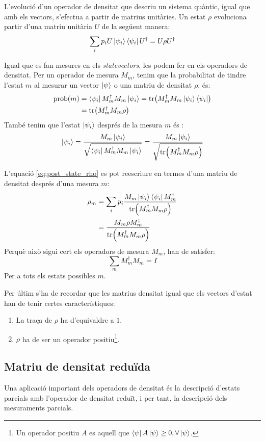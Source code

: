 L'evolució d'un operador de densitat que descriu un sistema quàntic, igual que amb els vectors, s'efectua a partir de matrius unitàries. Un estat $\rho$ evoluciona partir d'una matriu unitària $U$ de la següent manera:
$$
\sum_i p_i U \ket{\psi_i}\bra{\psi_i} U^\dagger = U\rho U^\dagger 
$$

Igual que es fan mesures en els \textit{statevectors}, les podem fer en els operadors de densitat. Per un operador de mesura $M_m$, tenim que la probabilitat de tindre l'estat $m$ al mesurar un vector $\ket{\psi}$ o una matriu de densitat $\rho$, és:
\begin{align*}
	\mathrm{prob}(m) &= \bra{\psi_i}M_m^\dagger M_m\ket{\psi_i} = \tr(M_m^\dagger M_m \ket{\psi_i}\bra{\psi_i})\\ &= \tr(M_m^\dagger M_m \rho)
\end{align*}
També tenim que l'estat $\ket{\psi_i}$ després de la mesura $m$ és \cite{QCandQI:density_matrix}:
\begin{equation}
	\ket{\psi_i} = \frac{M_m\ket{\psi_i}}{\sqrt{\bra{\psi_i}M_m^\dagger M_m \ket{\psi_i}}} = \frac{M_m\ket{\psi_i}}{\sqrt{\tr(M_m^\dagger M_m \rho)}}
	\label{eq:post_state_rho}
\end{equation}

L'equació \ref{eq:post_state_rho} es pot reescriure en termes d'una matriu de densitat després d'una mesura $m$:
\begin{align*}
	\rho_m &= \sum_i p_i \frac{M_m\ket{\psi_i}\bra{\psi_i}M_m^\dagger}{\tr(M_m^\dagger M_m \rho)} \\
	&= \frac{M_m\rho M_m^\dagger }{\tr(M_m^\dagger M_m\rho)}
\end{align*}
Perquè això sigui cert els operadors de mesura $M_m$, han de satisfer:
$$
\sum_m M_m^\dagger M_m = I
$$
Per a tots els estats possibles $m$.

Per últim s'ha de recordar que les matrius densitat igual que els vectors d'estat han de tenir certes característiques:
\begin{enumerate}
	\item La traça de $\rho$ ha d'equivaldre a $1$.
	\item $\rho$ ha de ser un operador positiu\footnote{Un operador positiu $A$ es aquell que $\bra{\psi}A\ket{\psi}\geq0, \forall \ket{\psi}$.}.
\end{enumerate}
\subsection{Matriu de densitat reduïda}
Una aplicació important dels operadors de densitat és la descripció d'estats parcials amb l'operador de densitat reduït, i per tant, la descripció dels mesuraments parcials.

